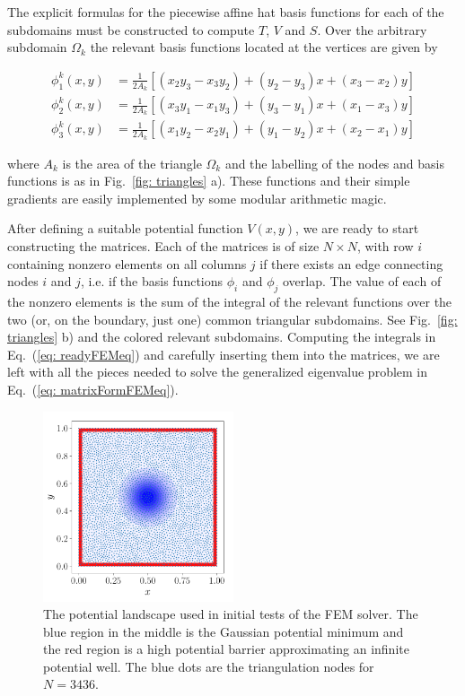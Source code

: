 \documentclass[a4paper,12pt]{article}
\begin{document}
The explicit formulas for the piecewise affine hat basis functions for each of the subdomains must be constructed to compute $T$, $V$ and $S$. Over the arbitrary subdomain $\Omega_k$ the relevant basis functions located at the vertices are given by

\begin{eqnarray}
\phi_1^k(x,y) &= \frac{1}{2A_k} \left[ (x_2y_3 - x_3y_2) + (y_2 - y_3)x + (x_3-x_2)y \right] \\
\phi_2^k(x,y) &= \frac{1}{2A_k} \left[ (x_3y_1 - x_1y_3) + (y_3 - y_1)x + (x_1-x_3)y  \right] \\
\phi_3^k(x,y) &= \frac{1}{2A_k} \left[ (x_1y_2 - x_2y_1) + (y_1 - y_2)x + (x_2-x_1)y \right]
\end{eqnarray}

where $A_k$ is the area of the triangle $\Omega_k$ and the labelling of the nodes and basis functions is as in Fig.~\ref{fig: triangles} a). These functions and their simple gradients are easily implemented by some modular arithmetic magic.

After defining a suitable potential function $V(x,y)$, we are ready to start constructing the matrices. Each of the matrices is of size $N \times N$, with row $i$ containing nonzero elements on all columns $j$ if there exists an edge connecting nodes $i$ and $j$, i.e. if the basis functions $\phi_i$ and $\phi_j$ overlap. The value of each of the nonzero elements is the sum of the integral of the relevant functions over the two (or, on the boundary, just one) common triangular subdomains. See Fig.~\ref{fig: triangles} b) and the colored relevant subdomains. Computing the integrals in Eq.~(\ref{eq: readyFEMeq}) and carefully inserting them into the matrices, we are left with all the pieces needed to solve the generalized eigenvalue problem in Eq.~(\ref{eq: matrixFormFEMeq}).

\begin{figure}[H]
\centering
\includegraphics[width=0.5\textwidth]{../figs/pot.pdf}
\caption{The potential landscape used in initial tests of the FEM solver. The blue region in the middle is the Gaussian potential minimum and the red region is a high potential barrier approximating an infinite potential well. The blue dots are the triangulation nodes for $N=3436$. }
\label{fig: gaussPot}
\end{figure}
\end{document}
